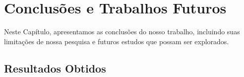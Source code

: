 \documentclass[
	12pt,				%
	openright,			%
	oneside,	
	a4paper,				%
	english,				%
	brazil				%
]{abntex2/abntex2} %
\begin{document}

	
\chapter{Conclusões e Trabalhos Futuros}

	Neste Capítulo, apresentamos as conclusões do nosso trabalho, incluindo suas limitações de nossa pesquisa e futuros estudos que possam ser explorados.

	\section{Resultados Obtidos}
\end{document}
